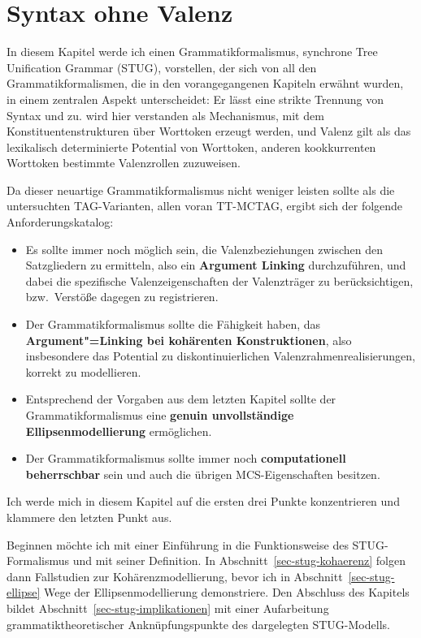 \chapter{Syntax ohne Valenz} \label{ch-ohne-valenz}

In diesem Kapitel werde ich einen Grammatikformalismus, synchrone Tree Unification Grammar (STUG), vorstellen, der sich von all den Grammatikformalismen, die in den vorangegangenen Kapiteln erwähnt wurden, in einem zentralen Aspekt unterscheidet: Er lässt eine strikte Trennung von Syntax und  zu.  wird hier verstanden als Mechanismus, mit dem Konstituentenstrukturen über Worttoken erzeugt werden, und Valenz gilt als das lexikalisch determinierte Potential von Worttoken, anderen kookkurrenten Worttoken bestimmte Valenzrollen zuzuweisen.  

Da dieser neuartige Grammatikformalismus nicht weniger leisten sollte als die untersuchten TAG-Varianten, allen voran TT-MCTAG, ergibt sich der folgende Anforderungskatalog:
\begin{itemize}
  \item Es sollte immer noch möglich sein, die Valenzbeziehungen zwischen den Satzgliedern zu ermitteln, also ein {\bf Argument Linking} durchzuführen, und dabei die spezifische Valenzeigenschaften der Valenzträger zu berücksichtigen, bzw.\ Verstö\ss e dagegen zu registrieren. 
  \item Der Grammatikformalismus sollte die Fähigkeit haben, das {\bf Argument"=Linking bei kohärenten Konstruktionen}, also insbesondere das Potential zu diskontinuierlichen Valenzrahmenrealisierungen, korrekt zu modellieren. 
  \item Entsprechend der Vorgaben aus dem letzten Kapitel sollte der Grammatikformalismus eine {\bf genuin unvollständige Ellipsenmodellierung} ermöglichen.
  \item Der Grammatikformalismus sollte immer noch {\bf computationell beherrschbar} sein und auch die übrigen MCS-Eigenschaften besitzen.
\end{itemize}
Ich werde mich in diesem Kapitel auf die ersten drei Punkte konzentrieren und klammere den letzten Punkt aus.

Beginnen möchte ich mit einer Einführung in die Funktionsweise des STUG-Formalismus und mit seiner Definition. In Abschnitt~\ref{sec-stug-kohaerenz} folgen dann Fallstudien zur Kohärenzmodellierung, bevor ich in Abschnitt~\ref{sec-stug-ellipse} Wege der Ellipsenmodellierung demonstriere. Den Abschluss des Kapitels bildet Abschnitt~\ref{sec-stug-implikationen} mit einer Aufarbeitung grammatiktheoretischer Anknüpfungspunkte des dargelegten STUG-Modells.


